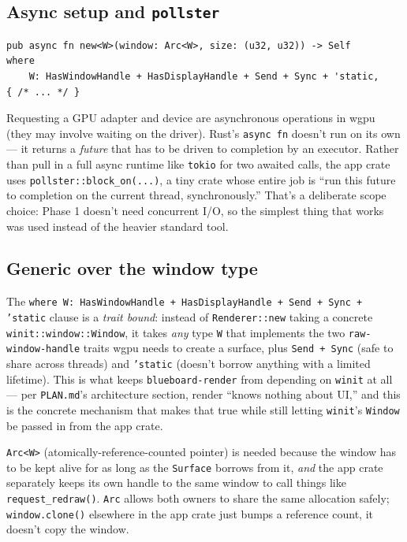 \documentclass[11pt]{article}
\begin{document}
\subsection{Async setup and \texttt{pollster}}
\begin{lstlisting}
pub async fn new<W>(window: Arc<W>, size: (u32, u32)) -> Self
where
    W: HasWindowHandle + HasDisplayHandle + Send + Sync + 'static,
{ /* ... */ }
\end{lstlisting}
Requesting a GPU adapter and device are asynchronous operations in wgpu (they may involve
waiting on the driver). Rust's \texttt{async fn} doesn't run on its own — it returns a
\emph{future} that has to be driven to completion by an executor. Rather than pull in a
full async runtime like \texttt{tokio} for two awaited calls, the app crate uses
\texttt{pollster::block\_on(...)}, a tiny crate whose entire job is ``run this future to
completion on the current thread, synchronously.'' That's a deliberate scope choice: Phase
1 doesn't need concurrent I/O, so the simplest thing that works was used instead of the
heavier standard tool.

\subsection{Generic over the window type}
The \texttt{where W: HasWindowHandle + HasDisplayHandle + Send + Sync + 'static} clause is
a \emph{trait bound}: instead of \texttt{Renderer::new} taking a concrete
\texttt{winit::window::Window}, it takes \emph{any} type \texttt{W} that implements the two
\texttt{raw-window-handle} traits wgpu needs to create a surface, plus \texttt{Send + Sync}
(safe to share across threads) and \texttt{'static} (doesn't borrow anything with a limited
lifetime). This is what keeps \texttt{blueboard-render} from depending on \texttt{winit} at
all — per \texttt{PLAN.md}'s architecture section, render ``knows nothing about UI,'' and
this is the concrete mechanism that makes that true while still letting \texttt{winit}'s
\texttt{Window} be passed in from the app crate.

\texttt{Arc<W>} (atomically-reference-counted pointer) is needed because the window has to
be kept alive for as long as the \texttt{Surface} borrows from it, \emph{and} the app crate
separately keeps its own handle to the same window to call things like
\texttt{request\_redraw()}. \texttt{Arc} allows both owners to share the same allocation
safely; \texttt{window.clone()} elsewhere in the app crate just bumps a reference count, it
doesn't copy the window.
\end{document}
